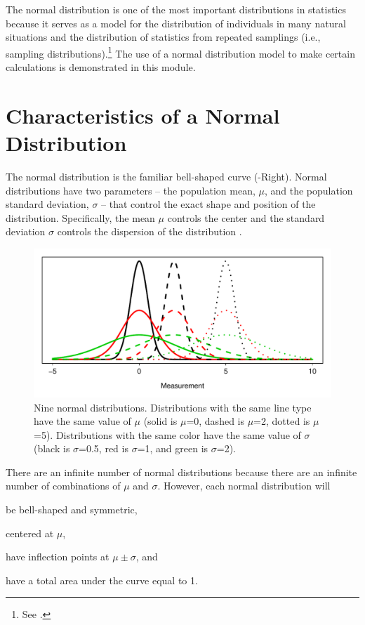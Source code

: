 \documentclass[10pt,openany]{book}\usepackage[]{graphicx}\usepackage[]{color}
\newenvironment{knitrout}{}{} %
\begin{document}
The normal distribution is one of the most important distributions in statistics because it serves as a model for the distribution of individuals in many natural situations and the distribution of statistics from repeated samplings (i.e., sampling distributions).\footnote{See .}  The use of a normal distribution model to make certain calculations is demonstrated in this module.


\section{Characteristics of a Normal Distribution}
The normal distribution is the familiar bell-shaped curve (-Right). Normal distributions have two parameters -- the population mean, $\mu$, and the population standard deviation, $\sigma$ -- that control the exact shape and position of the distribution. Specifically, the mean $\mu$ controls the center and the standard deviation $\sigma$ controls the dispersion of the distribution .

\begin{knitrout}
\color{fgcolor}\begin{figure}[hbtp]

{\centering \includegraphics[width=.8\linewidth]{Figs/NormMultDists-1} 

}

\caption[Nine normal distributions]{Nine normal distributions. Distributions with the same line type have the same value of $\mu$ (solid is $\mu$=0, dashed is $\mu$=2, dotted is $\mu$=5). Distributions with the same color have the same value of $\sigma$ (black is $\sigma$=0.5, red is $\sigma$=1, and green is $\sigma$=2).}\label{fig:NormMultDists}
\end{figure}


\end{knitrout}

There are an infinite number of normal distributions because there are an infinite number of combinations of $\mu$ and $\sigma$. However, each normal distribution will
\begin{Enumerate}
  \item be bell-shaped and symmetric,
  \item centered at $\mu$,
  \item have inflection points at $\mu \pm \sigma$, and
  \item have a total area under the curve equal to 1.
\end{Enumerate}
\end{document}

